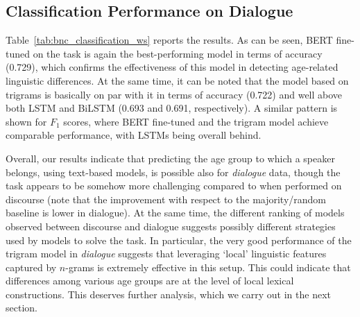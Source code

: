 \subsection{Classification Performance on Dialogue}
Table~\ref{tab:bnc_classification_ws} reports the results. As can be seen, BERT fine-tuned on the task is again the best-performing model in terms of accuracy (0.729), which confirms the effectiveness of this model in detecting age-related linguistic differences. At the same time, it can be noted that the model based on trigrams is basically on par with it in terms of accuracy (0.722) and well above both LSTM and BiLSTM (0.693 and 0.691, respectively). A similar pattern is shown for $F_1$ scores, where BERT fine-tuned and the trigram model achieve comparable performance, with LSTMs being overall behind. 

Overall, our results indicate that predicting the age group to which a speaker belongs, using text-based models, is possible also for \emph{dialogue} data, though the task appears to be somehow more challenging compared to when performed on discourse 
(note that the improvement with respect to the majority/random baseline is lower in dialogue). 
At the same time, the different ranking of models observed between discourse and dialogue suggests possibly different strategies used by models to solve the task. In particular, the very good performance of the trigram model in \emph{dialogue} suggests that leveraging `local' linguistic features captured by $n$-grams is extremely effective in this setup. This could indicate that differences among various age groups are at the level of
local lexical constructions.
This deserves further analysis, which we carry out in the next section.




